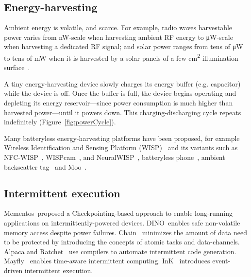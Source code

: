 \subsection{Energy-harvesting}

Ambient energy is volatile, and scarce. For example, radio waves harvestable power varies from \si{\nano\watt}-scale when harvesting ambient RF energy to \si{\uW}-scale when harvesting a dedicated RF signal; and solar power ranges from tens of \si{\uW} to tens of \si{\mW} when it is harvested by a solar panels of a few \si{\cm^2} illumination surface~\cite{lucia2017intermittent,rao2017ambient}.%

A tiny energy-harvesting device slowly charges its energy buffer (e.g. capacitor) while the device is off. Once the buffer is full, the device begins operating and depleting its energy reservoir---since power consumption is much higher than harvested power---until it powers down. This charging-discharging cycle repeats indefinitely (Figure~\ref{fig:powerCycle}). 

Many batteryless energy-harvesting platforms have been proposed, for example Wireless Identification and Sensing Platform (WISP)~\cite{smith_ubicomp_2006} and its variants such as NFC-WISP~\cite{zhao2015nfc}, WISPcam~\cite{naderiparizi_rfid_2015}, and NeuralWISP~\cite{yeager2009neuralwisp}, batteryless phone~\cite{talla2017battery}, ambient backscatter tag~\cite{liu2013ambient} and Moo~\cite{moo}.

\subsection{Intermittent execution}
Mementos~\cite{mementos}proposed a
Checkpointing-based approach to enable long-running applications on intermittently-powered devices. DINO~\cite{dino}enables safe non-volatile memory access despite power failures. Chain~\cite{colin2016chain} minimizes the amount of data need to be protected by introducing the concepts of atomic tasks and data-channels. Alpaca and Ratchet~\cite{maeng2017alpaca,woude2016ratchet} use compilers to automate intermittent code generation. Mayfly~\cite{hester2017timerly} enables time-aware intermittent computing. InK~\cite{yildirim2018ink} introduces event-driven intermittent execution.

